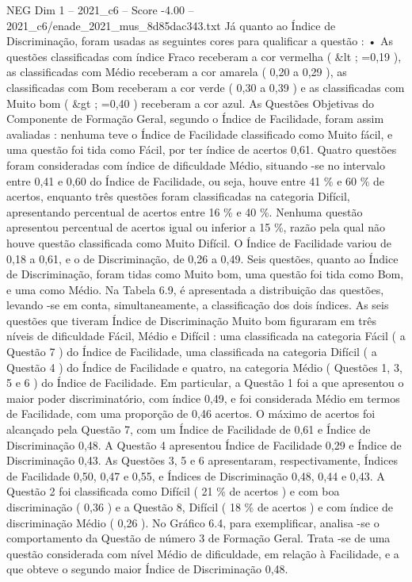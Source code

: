 \begin{textsample}{NEG Dim 1 – 2021\_c6 – Score -4.00 – 2021\_c6/enade\_2021\_mus\_8d85dac343.txt}
Já quanto ao Índice de Discriminação, foram usadas as seguintes cores para qualificar a questão : • As questões classificadas com índice Fraco receberam a cor vermelha ( \&lt ; =0,19 ), as classificadas com Médio receberam a cor amarela ( 0,20 a 0,29 ), as classificadas com Bom receberam a cor verde ( 0,30 a 0,39 ) e as classificadas com Muito bom ( \&gt ; =0,40 ) receberam a cor azul.
As Questões Objetivas do Componente de Formação Geral, segundo o Índice de Facilidade, foram assim avaliadas : nenhuma teve o Índice de Facilidade classificado como Muito fácil, e uma questão foi tida como Fácil, por ter índice de acertos 0,61.
Quatro questões foram consideradas com índice de dificuldade Médio, situando -se no intervalo entre 0,41 e 0,60 do Índice de Facilidade, ou seja, houve entre 41 \% e 60 \% de acertos, enquanto três questões foram classificadas na categoria Difícil, apresentando percentual de acertos entre 16 \% e 40 \%.
Nenhuma questão apresentou percentual de acertos igual ou inferior a 15 \%, razão pela qual não houve questão classificada como Muito Difícil.
O Índice de Facilidade variou de 0,18 a 0,61, e o de Discriminação, de 0,26 a 0,49.
Seis questões, quanto ao Índice de Discriminação, foram tidas como Muito bom, uma questão foi tida como Bom, e uma como Médio.
Na Tabela 6.9, é apresentada a distribuição das questões, levando -se em conta, simultaneamente, a classificação dos dois índices.
As seis questões que tiveram Índice de Discriminação Muito bom figuraram em três níveis de dificuldade Fácil, Médio e Difícil : uma classificada na categoria Fácil ( a Questão 7 ) do Índice de Facilidade, uma classificada na categoria Difícil ( a Questão 4 ) do Índice de Facilidade e quatro, na categoria Médio ( Questões 1, 3, 5 e 6 ) do Índice de Facilidade.
Em particular, a Questão 1 foi a que apresentou o maior poder discriminatório, com índice 0,49, e foi considerada Médio em termos de Facilidade, com uma proporção de 0,46 acertos.
O máximo de acertos foi alcançado pela Questão 7, com um Índice de Facilidade de 0,61 e Índice de Discriminação 0,48.
A Questão 4 apresentou Índice de Facilidade 0,29 e Índice de Discriminação 0,43.
As Questões 3, 5 e 6 apresentaram, respectivamente, Índices de Facilidade 0,50, 0,47 e 0,55, e Índices de Discriminação 0,48, 0,44 e 0,43.
A Questão 2 foi classificada como Difícil ( 21 \% de acertos ) e com boa discriminação ( 0,36 ) e a Questão 8, Difícil ( 18 \% de acertos ) e com índice de discriminação Médio ( 0,26 ).
No Gráfico 6.4, para exemplificar, analisa -se o comportamento da Questão de número 3 de Formação Geral.
Trata -se de uma questão considerada com nível Médio de dificuldade, em relação à Facilidade, e a que obteve o segundo maior Índice de Discriminação 0,48.

\end{textsample}
